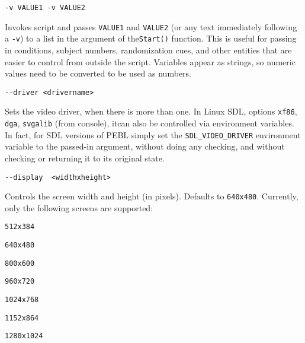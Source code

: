 \begin{description}

\item
\begin{verbatim}
-v VALUE1 -v VALUE2
\end{verbatim}
  Invokes script and passes \texttt{VALUE1} and \texttt{VALUE2} (or any text
  immediately following a \texttt{-v}) to a list in the argument of
  the\texttt{Start()}  function. \newline This is useful for passing in
  conditions, subject numbers, randomization cues, and other
  entities that are easier to control from outside  the
  script.  Variables appear as strings, so numeric values
  need to be converted to be used as numbers.

\item 
\begin{verbatim}
--driver <drivername>
\end{verbatim}
  Sets the video driver, when there is more than one.  In Linux
  SDL, options  \texttt{xf86}, \texttt{dga}, \texttt{svgalib} (from console), itcan also be controlled
  via environment variables.  In fact, for SDL versions of
  PEBL simply set the \texttt{SDL\_VIDEO\_DRIVER} environment variable
  to the passed-in argument, without doing any checking, and
  without checking or returning it to its original state.  

\item
\begin{verbatim}
--display  <widthxheight>
\end{verbatim}
  Controls the screen width and height (in pixels). Defaults
  to \texttt{640x480}.
  Currently, only the following screens are supported:
\begin{description}
\item
\begin{verbatim}
512x384
\end{verbatim}
\item
\begin{verbatim}
640x480
\end{verbatim}
\item
\begin{verbatim}
800x600
\end{verbatim}
\item
\begin{verbatim}
960x720
\end{verbatim}
\item
\begin{verbatim}
1024x768
\end{verbatim}
\item
\begin{verbatim}
1152x864
\end{verbatim}
\item
\begin{verbatim}
1280x1024
\end{verbatim}
\end{description}


\end{description}
